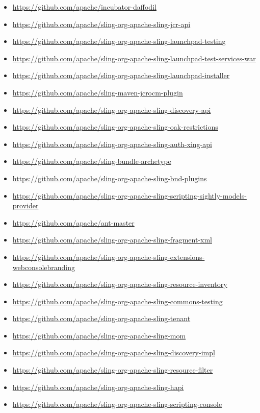 \documentclass[sigconf]{acmart}
\begin{document}
\begin{itemize}
  \item \url{https://github.com/apache/incubator-daffodil}
  \item \url{https://github.com/apache/sling-org-apache-sling-jcr-api}
  \item \url{https://github.com/apache/sling-org-apache-sling-launchpad-testing}
  \item \url{https://github.com/apache/sling-org-apache-sling-launchpad-test-services-war}
  \item \url{https://github.com/apache/sling-org-apache-sling-launchpad-installer}
  \item \url{https://github.com/apache/sling-maven-jcrocm-plugin}
  \item \url{https://github.com/apache/sling-org-apache-sling-discovery-api}
  \item \url{https://github.com/apache/sling-org-apache-sling-oak-restrictions}
  \item \url{https://github.com/apache/sling-org-apache-sling-auth-xing-api}
  \item \url{https://github.com/apache/sling-bundle-archetype}
  \item \url{https://github.com/apache/sling-org-apache-sling-bnd-plugins}
  \item \url{https://github.com/apache/sling-org-apache-sling-scripting-sightly-models-provider}
  \item \url{https://github.com/apache/ant-master}
  \item \url{https://github.com/apache/sling-org-apache-sling-fragment-xml}
  \item \url{https://github.com/apache/sling-org-apache-sling-extensions-webconsolebranding}
  \item \url{https://github.com/apache/sling-org-apache-sling-resource-inventory}
  \item \url{https://github.com/apache/sling-org-apache-sling-commons-testing}
  \item \url{https://github.com/apache/sling-org-apache-sling-tenant}
  \item \url{https://github.com/apache/sling-org-apache-sling-mom}
  \item \url{https://github.com/apache/sling-org-apache-sling-discovery-impl}
  \item \url{https://github.com/apache/sling-org-apache-sling-resource-filter}
  \item \url{https://github.com/apache/sling-org-apache-sling-hapi}
  \item \url{https://github.com/apache/sling-org-apache-sling-scripting-console}

\end{itemize}
\end{document}
